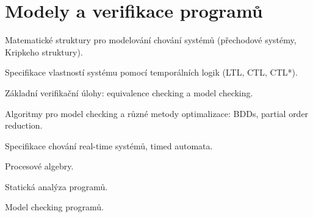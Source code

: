 \newpage
\section{Modely a verifikace programů}
\begin{pozadavky}
\begin{pitemize}
\item Matematické struktury pro modelování chování systémů (přechodové systémy, Kripkeho struktury).
\item Specifikace vlastností systému pomocí temporálních logik (LTL, CTL, CTL*).
\item Základní verifikační úlohy: equivalence checking a model checking.
\item Algoritmy pro model checking a různé metody optimalizace: BDDs, partial order reduction.
\item Specifikace chování real-time systémů, timed automata.
\item Procesové algebry.
\item Statická analýza programů.
\item Model checking programů.
\end{pitemize}
\end{pozadavky}